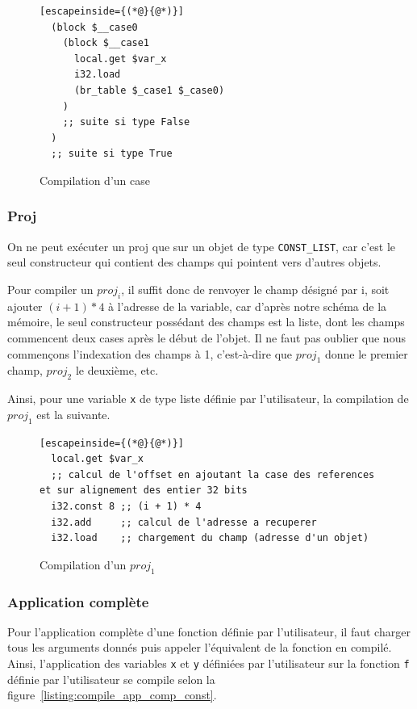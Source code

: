 \documentclass{rapportECL}
\begin{document}
\begin{figure}[H]
	\begin{lstlisting}[escapeinside={(*@}{@*)}]
  (block $__case0
    (block $__case1
      local.get $var_x
      i32.load
      (br_table $_case1 $_case0)
	)
    ;; suite si type False
  )
  ;; suite si type True
	\end{lstlisting}
	\caption{Compilation d'un case}
	\label{listing:compile_case}
\end{figure}

\subsubsection{Proj}

On ne peut exécuter un proj que sur un objet de type \verb|CONST_LIST|, car c'est le seul constructeur qui contient des champs qui
pointent vers d'autres objets.

Pour compiler un $proj_i$, il suffit donc de renvoyer le champ désigné par i, soit ajouter $(i + 1)*4$ à l'adresse de la variable, car
d'après notre schéma de la mémoire, le seul constructeur possédant des champs est la liste, dont les champs commencent deux cases 
après le début de l'objet.
Il ne faut pas oublier que nous commençons l'indexation des champs à 1, c'est-à-dire que $proj_1$ donne le premier champ, 
$proj_2$ le deuxième, etc.

Ainsi, pour une variable \verb|x| de type liste définie par l'utilisateur, la compilation de $proj_1$ est la suivante.
\begin{figure}[H]
	\begin{lstlisting}[escapeinside={(*@}{@*)}]
  local.get $var_x
  ;; calcul de l'offset en ajoutant la case des references et sur alignement des entier 32 bits
  i32.const 8 ;; (i + 1) * 4
  i32.add     ;; calcul de l'adresse a recuperer
  i32.load    ;; chargement du champ (adresse d'un objet)
\end{lstlisting}
\caption{Compilation d'un $proj_1$}
\label{listing:compile_proj}
\end{figure}

\subsubsection{Application complète}

Pour l'application complète d'une fonction définie par l'utilisateur, il faut charger tous les arguments donnés puis appeler 
l'équivalent de la fonction en compilé. Ainsi, l'application des variables \verb|x| et \verb|y| définiées par l'utilisateur sur 
la fonction \verb|f| définie par l'utilisateur se compile selon la figure~\ref{listing:compile_app_comp_const}.
\end{document}
